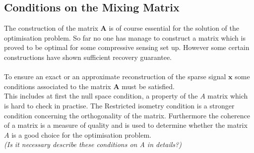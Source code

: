 \subsection{Conditions on the Mixing Matrix}
The construction of the matrix $\mathbf{A}$ is of course essential for the solution of the optimisation problem. So far no one has manage to construct a matrix which is proved to be optimal for some compressive sensing set up. However some certain constructions have shown sufficient recovery guarantee.\\ \\
To ensure an exact or an approximate reconstruction of the sparse signal $\mathbf{x}$ some conditions associated to the matrix $\mathbf{A}$ must be satisfied.\\
This includes at first the null space condition, a property of the $A$ matrix which is hard to check in practise. The Restricted isometry condition is a stronger condition concerning the orthogonality of the matrix. Furthermore the coherence of a matrix is a measure of quality and is used to determine whether the matrix $A$ is a good choice for the optimisation problem.\\    
\textit{(Is it necessary describe these conditions on A in details?)}

